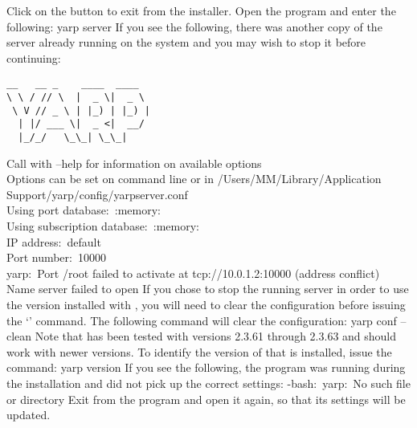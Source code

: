 Click on the  button to exit from the installer.
\newpage
\tertiaryEnd{}
Open the  program and enter the following:
\outputBegin{}
yarp server
\outputEnd{}
If you see the following, there was another copy of the \yarp{} server already running on
the system and you may wish to stop it before continuing:
\outputBegin{}
\begin{verbatim}
__   __ _    ____  ____  
\ \ / // \  |  _ \|  _ \ 
 \ V // _ \ | |_) | |_) |
  | |/ ___ \|  _ <|  __/ 
  |_/_/   \_\_| \_\_|    
\end{verbatim}
Call with --help for information on available options\\
Options can be set on command line or in /Users/M\textunderscore{}M/Library/Application\\
\hspace*{5em}Support/yarp/config/yarpserver.conf\\
Using port database:\ :memory:\\
Using subscription database:\ :memory:\\
IP address:\ default\\
Port number:\ 10000\\
yarp:\ Port /root failed to activate at tcp://10.0.1.2:10000 (address conflict)\\
Name server failed to open
\outputEnd{}
If you chose to stop the running \yarp{} server in order to use the version installed with
\mplusm, you will need to clear the \yarp{} configuration before issuing the
`\asCode{yarp server}' command.
The following command will clear the \yarp{} configuration:
\outputBegin{}
yarp conf --clean
\outputEnd{}
Note that \mplusm{} has been tested with \yarp{} versions 2.3.61 through 2.3.63 and should
work with newer versions.
To identify the version of \yarp{} that is installed, issue the command:
\outputBegin{}
yarp version
\outputEnd{}
If you see the following, the  program was running during the
installation and did not pick up the correct settings:
\outputBegin{}
-bash:\ yarp:\ No such file or directory
\outputEnd{}
Exit from the  program and open it again, so that its settings will be
updated.\\

